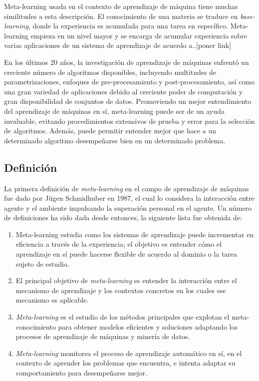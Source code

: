 Meta-learning usada en el contexto de aprendizaje de máquina tiene muchas similitudes a esta descripción. El conocimiento de una materia se traduce en \textit{base-learning}, donde la experiencia es acumulada para una tarea en específico. Meta-learning empieza en un nivel mayor y se encarga de acumular experiencia sobre varias aplicaciones de un sistema de aprendizaje de acuerdo a..[poner link]

En los últimos 20 años, la investigación de aprendizaje de máquinas enfrentó un creciente número de algoritmos disponibles, incluyendo multitudes de parametrizaciones, enfoques de pre-procesamiento y post-procesamiento, así como una gran variedad de aplicaciones debido al creciente poder de computación y gran disponibilidad de conjuntos de datos. Promoviendo un mejor entendimiento del aprendizaje de máquinas en sí, meta-learning puede ser de un ayuda invaluable, evitando procedimientos extensivos de prueba y error para la selección de algoritmos. Además, puede permitir entender mejor que hace a un determinado algoritmo desempeñarse bien en un determinado problema.

\subsection{Definición}\label{subsec:mtl-definition}


La primera definición de \textit{meta-learning} en el campo de aprendizaje de máquinas fue dado por J\"ugen Schmidhuber en 1987, el cual lo considera la interacción entre agente y el ambiente impulsando la superación personal en el agente. Un número de definiciones ha sido dada desde entonces, la siguiente lista fue obtenida de:

\begin{enumerate}
	\item Meta-learning estudia como los sistemas de aprendizaje puede incrementar en eficiencia a través de la experiencia; el objetivo es entender cómo el aprendizaje en sí puede hacerse flexible de acuerdo al dominio o la tarea sujeto de estudio.
	\item El principal objetivo de \emph{meta-learning} es entender la interacción entre el mecanismo de aprendizaje y los contextos concretos en los cuales ese mecanismo es aplicable.
	\item \emph{Meta-learning} es el estudio de los métodos principales que explotan el meta-conocimiento para obtener modelos eficientes y soluciones adaptando los procesos de aprendizaje de máquinas y minería de datos.
	\item \emph{Meta-learning} monitorea el proceso de aprendizaje automático en sí, en el contexto de aprender los problemas que encuentra, e intenta adaptar su comportamiento para desempeñarse mejor.
\end{enumerate}

